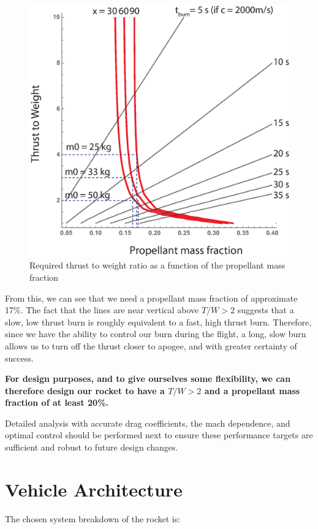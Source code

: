 \documentclass[12pt]{article}
\begin{document}
\begin{figure}[htbp]
   \centering
   \includegraphics[width=0.8\linewidth]{perf_req.eps}
   \caption{Required thrust to weight ratio as a function of the propellant mass fraction}
   \label{fig:PMF}
\end{figure}


From this, we can see that we need a propellant mass fraction of approximate 17\%. The fact that the lines are near vertical above $T/W>2$ suggests that a slow, low thrust burn is roughly equivalent to a fast, high thrust burn. Therefore, since we have the ability to control our burn during the flight, a long, slow burn allows us to turn off the thrust closer to apogee, and with greater certainty of success. 

\textbf{For design purposes, and to give ourselves some flexibility, we can therefore design our rocket to have a $T/W>2$ and a propellant mass fraction of at least 20\%. }

Detailed analysis with accurate drag coefficients, the mach dependence, and optimal control should be performed next to ensure these performance targets are sufficient and robust to future design changes. 

\section{Vehicle Architecture}

The chosen system breakdown of the rocket is:
 
\end{document}
